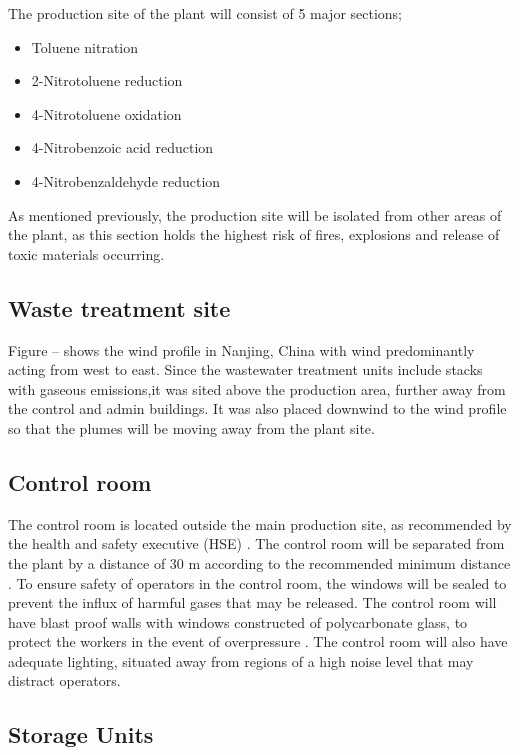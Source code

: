 The production site of the plant will consist of 5 major sections; 

\begin{itemize}
    \item Toluene nitration
    \item 2-Nitrotoluene reduction 
    \item 4-Nitrotoluene oxidation 
    \item 4-Nitrobenzoic acid reduction 
    \item 4-Nitrobenzaldehyde reduction 
\end{itemize}

As mentioned previously, the production site will be isolated from other areas of the plant, as this section holds the highest risk of fires, explosions  and release of toxic materials occurring. 

\subsection{Waste treatment site}

Figure -- shows the wind profile in Nanjing, China with wind predominantly acting from west to east. Since the wastewater treatment units include stacks with gaseous emissions,it was sited above the production area, further away from the control and admin buildings. It was also placed downwind to the wind profile so that the plumes will be moving away from the plant site. 

\subsection{Control room}

The control room is located outside the main production site, as recommended by the health and safety executive (HSE) \cite{health_and_safety_executive_control_nodate}. The control room will be separated from the plant by a distance of 30 m according to the recommended minimum distance \cite{mannan_lees_2012}. To ensure safety of operators in the control room, the windows will be sealed to prevent the influx of harmful gases that may be released. The control room will have blast proof walls with windows constructed of polycarbonate glass, to protect the workers in the event of overpressure \cite{health_and_safety_executive_control_nodate}. The control room will also have adequate lighting, situated away from regions of a high noise level that may distract operators.

\subsection{Storage Units}

